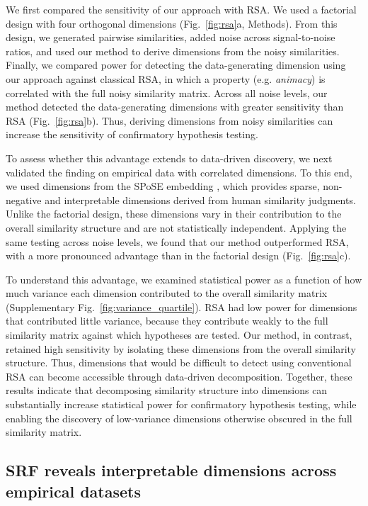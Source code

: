 \documentclass{article}
\begin{document}
We first compared the sensitivity of our approach with RSA. We used a factorial design with four orthogonal dimensions (Fig.~\ref{fig:rsa}a, Methods). From this design, we generated pairwise similarities, added noise across signal-to-noise ratios, and used our method to derive dimensions from the noisy similarities. Finally, we compared power for detecting the data-generating dimension using our approach against classical RSA, in which a property (e.g. \textit{animacy}) is correlated with the full noisy similarity matrix. Across all noise levels, our method detected the data-generating dimensions with greater sensitivity than RSA (Fig.~\ref{fig:rsa}b). Thus,  deriving dimensions from noisy similarities can increase the sensitivity of confirmatory hypothesis testing.

To assess whether this advantage extends to data-driven discovery, we next validated the finding on empirical data with correlated dimensions. To this end, we used dimensions from the SPoSE embedding \citep{Hebart2020}, which provides sparse, non-negative and interpretable dimensions derived from human similarity judgments. Unlike the factorial design, these dimensions vary in their contribution to the overall similarity structure and are not statistically independent. Applying the same testing across noise levels, we found that our method outperformed RSA, with a more pronounced advantage than in the factorial design (Fig.~\ref{fig:rsa}c).

To understand this advantage, we examined statistical power as a function of how much variance each dimension contributed to the overall similarity matrix (Supplementary Fig.~\ref{fig:variance_quartile}). RSA had low power for dimensions that contributed little variance, because they contribute weakly to the full similarity matrix against which hypotheses are tested. Our method, in contrast, retained high sensitivity by isolating these dimensions from the overall similarity structure. Thus, dimensions that would be difficult to detect using conventional RSA can become accessible through data-driven decomposition. Together, these results indicate that decomposing similarity structure into dimensions can substantially increase statistical power for confirmatory hypothesis testing, while enabling the discovery of low-variance dimensions otherwise obscured in the full similarity matrix.


\subsection{SRF reveals interpretable dimensions across empirical datasets}
\end{document}
